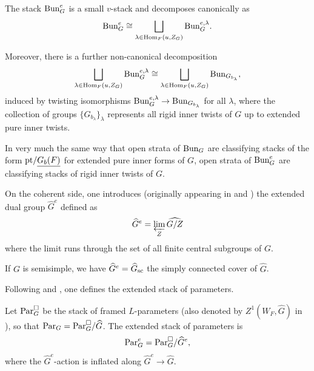\begin{thm}
    The stack $\mathrm{Bun}_G^e$ is a small $v$-stack and decomposes canonically as 
    \begin{equation*}
        \mathrm{Bun}_G^e \cong \bigsqcup_{\lambda \in \mathrm{Hom}_{F}(u,Z_{G})} \mathrm{Bun}_{G}^{e,\lambda}.
    \end{equation*}
   
    Moreover, there is a further non-canonical decomposition
    \begin{equation} \label{eq:decomp-bun-g-e-intro}
        \bigsqcup_{\lambda \in \mathrm{Hom}_{F}(u,Z_{G})} \mathrm{Bun}_{G}^{e,\lambda}  \cong  \bigsqcup_{\lambda \in \mathrm{Hom}_{F}(u,Z_{G})} \mathrm{Bun}_{G_{b_{\lambda}}},
    \end{equation}
     induced by twisting isomorphisms $\mathrm{Bun}_{G}^{e,\lambda} \to  \mathrm{Bun}_{G_{b_{\lambda}}}$ for all $\lambda$, where the collection of groups $\{G_{b_{\lambda}}\}_{\lambda}$ represents all rigid inner twists of $G$ up to extended pure inner twists. 
\end{thm}
In very much the same way that open strata of $\mathrm{Bun}_G$ are classifying stacks of the form $\mathrm{pt}/\underline{G_b(F)}$ for extended pure inner forms of $G$, open strata of $\mathrm{Bun}_G^e$ are classifying stacks of rigid inner twists of $G$.

On the coherent side, one introduces \cite[\S 12.1]{Fargues22} (originally appearing in \cite{Vog93} and \cite{Kaletha18}) the extended dual group $\widehat{G}^e$ defined as 
\begin{equation*}
    \widehat{G}^e = \varprojlim_{Z} \widehat{G/Z}
\end{equation*}
where the limit runs through the set of all finite central subgroups of $G$.
\begin{rque}
    If $G$ is semisimple, we have $\widehat{G}^e = \widehat{G}_{\textnormal{sc}}$ the simply connected cover of $\widehat{G}$.
\end{rque}
Following \cite{Kal16} and \cite{Fargues22}, one defines the extended stack of parameters. 
\begin{defi}
    Let $\mathrm{Par}_G^{\square}$ be the stack of framed $L$-parameters (also denoted by $Z^1(W_F, \widehat{G})$ in \cite{DHKM}), so that $\mathrm{Par}_G = \mathrm{Par}_G^{\square}/\widehat{G}$. The extended stack of parameters is 
    $$\mathrm{Par}_G^e = \mathrm{Par}_G^{\square}/\widehat{G}^e,$$
    where the $\widehat{G}^{e}$-action is inflated along $\widehat{G}^{e} \to \widehat{G}$. 
\end{defi}

